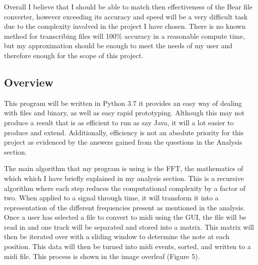 \documentclass[12pt]{report}
\begin{document}
Overall I believe that I should be able to match then effectiveness of the Bear file converter, however exceeding its accuracy and speed will be a very difficult task due to the complexity involved in the project I have chosen. There is no known method for transcribing files will 100\% accuracy in a reasonable compute time, but my approximation should be enough to meet the needs of my user and therefore enough for the scope of this project.

\subsection*{Overview}
This program will be written in Python 3.7 it provides an easy way of dealing with files and binary, as well as easy rapid prototyping. Although this may not produce a result that is as efficient to run as say Java, it will a lot easier to produce and extend. Additionally, efficiency is not an absolute priority for this project as evidenced by the answers gained from the questions in the Analysis section.

The main algorithm that my program is using is the FFT, the mathematics of which which I have briefly explained in my analysis section. This is a recursive algorithm where each step reduces the computational complexity by a factor of two. When applied to a signal through time, it will transform it into a representation of the different frequencies present as mentioned in the analysis. Once a user has selected a file to convert to midi using the GUI, the file will be read in and one track will be separated and stored into a matrix. This matrix will then be iterated over with a sliding window to determine the note at each position. This data will then be turned into midi events, sorted, and written to a midi file. This process is shown in the image overleaf (Figure 5).
\end{document}
